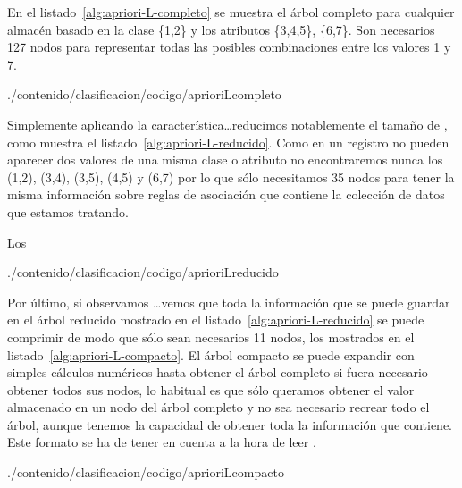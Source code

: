 En el listado~\ref{alg:apriori-L-completo} se muestra el árbol \aprioriL completo para cualquier almacén \D basado en la clase \{1,2\} y los atributos \{3,4,5\}, \{6,7\}. Son necesarios 127 nodos para representar todas las posibles combinaciones entre los valores 1 y 7.

\afterpage{\clearpage}

                 {./contenido/clasificacion/codigo/aprioriLcompleto}


Simplemente aplicando la característica\ldots reducimos notablemente el tamaño de \aprioriL, como muestra el listado~\ref{alg:apriori-L-reducido}. Como en un registro no pueden aparecer dos valores de una misma clase o atributo no encontraremos nunca los \itemsets (1,2), (3,4), (3,5), (4,5) y (6,7) por lo que sólo necesitamos 35 nodos para tener la misma información sobre reglas de asociación que contiene la colección de datos que estamos tratando. 

Los

\afterpage{\clearpage}

                 {./contenido/clasificacion/codigo/aprioriLreducido}

Por último, si observamos \ldots vemos que toda la información que se puede guardar en el árbol \aprioriL reducido mostrado en el listado~\ref{alg:apriori-L-reducido} se puede comprimir de modo que sólo sean necesarios 11 nodos, los mostrados en el listado~\ref{alg:apriori-L-compacto}. El árbol \aprioriL compacto se puede expandir con simples cálculos numéricos hasta obtener el árbol \aprioriL completo si fuera necesario obtener todos sus nodos, lo habitual es que sólo queramos obtener el valor almacenado en un nodo del árbol \aprioriL completo y no sea necesario recrear todo el árbol, aunque tenemos la capacidad de obtener toda la información que contiene. Este formato se ha de tener en cuenta a la hora de leer \D.

\afterpage{\clearpage}

                 {./contenido/clasificacion/codigo/aprioriLcompacto}

